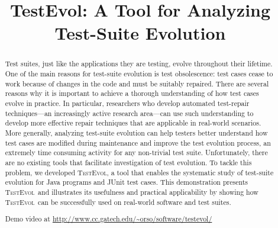 \documentclass[conference]{IEEEtran}
\newcommand{\tool}{\textsc{TestEvol}\xspace}
\begin{document}
\title{TestEvol: A Tool for Analyzing Test-Suite Evolution}

\author{
\and
{}
\and
{}
}

\maketitle

\pagestyle{empty}


\begin{abstract}
  Test suites, just like the applications they are testing, evolve
  throughout their lifetime.  One of the main reasons for test-suite
  evolution is test obsolescence: test cases cease to work because of
  changes in the code and must be suitably repaired. There are several
  reasons why it is important to achieve a thorough understanding of
  how test cases evolve in practice. In particular, researchers who
  develop automated test-repair techniques---an increasingly active
  research area---can use such understanding to develop more effective
  repair techniques that are applicable in real-world scenarios. More
  generally, analyzing test-suite evolution can help testers better
  understand how test cases are modified during maintenance and
  improve the test evolution process, an extremely time consuming
  activity for any non-trivial test suite.  Unfortunately, there are
  no existing tools that facilitate investigation of test evolution.
  To tackle this problem, we developed \tool, a tool that enables the
  systematic study of test-suite evolution for Java programs and JUnit
  test cases. This demonstration presents \tool\ and illustrates its
  usefulness and practical applicability by showing how \tool\ can be
  successfully used on real-world software and test suites.

  \noindent
  Demo video at {\small \url{http://www.cc.gatech.edu/~orso/software/testevol/}}

\end{abstract}
\end{document}
